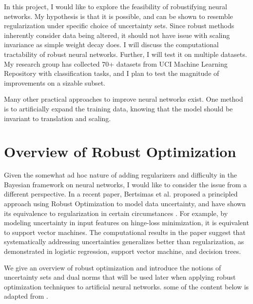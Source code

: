 \documentclass[twoside,12pt]{article}
\begin{document}
In this project, I would like to explore the feasibility of robustifying neural networks. My hypothesis is that it is possible, and can be shown to resemble regularization under specific choice of uncertainty sets. Since robust methods inherently consider data being altered, it should not have issue with scaling invariance as simple weight decay does. I will discuss the computational tractability of robust neural networks. Further, I will test it on multiple datasets. My research group has collected 70+ datasets from UCI Machine Learning Repository with classification tasks, and I plan to test the magnitude of improvements on a sizable subset.

Many other practical approaches to improve neural networks exist. One method is to artificially expand the training data, knowing that the model should be invariant to translation and scaling. 

\section{Overview of Robust Optimization}
Given the somewhat ad hoc nature of adding regularizers and difficulty in the Bayesian framework on neural networks, I would like to consider the issue from a different perspective. In a recent paper, Bertsimas et al. proposed a principled approach using Robust Optimization to model data uncertainty, and have shown its equivalence to regularization in certain circumstances \cite{bertsimas2015robust}. For example, by modeling uncertainty in input features  on hinge-loss minimization, it is equivalent to support vector machines. The computational results in the paper suggest that systematically addressing uncertainties generalizes better than regularization, as demonstrated in logistic regression, support vector machine, and decision trees. 



We give an overview of robust optimization and introduce the notions of uncertainty sets and dual norms that will be used later when applying robust optimization techniques to artificial neural networks. some of the content below is adapted from \cite{bertsimas2015robust}.
\end{document}

